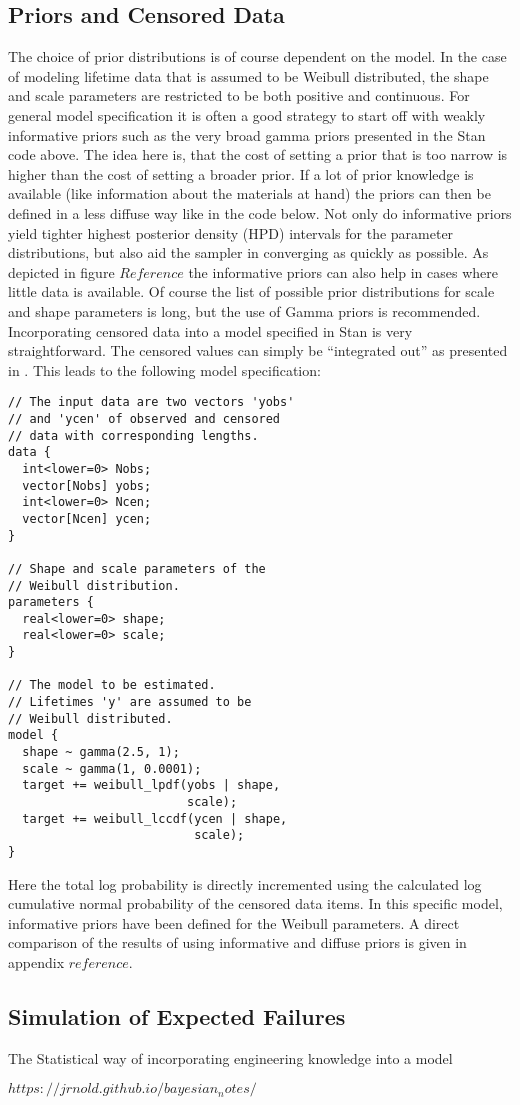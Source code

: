 \subsection{Priors and Censored Data}
The choice of prior distributions is of course dependent on the model. In the case of modeling lifetime data that is assumed to be Weibull distributed, the shape and scale parameters are restricted to be both positive and continuous. For general model specification it is often a good strategy to start off with weakly informative priors such as the very broad gamma priors presented in the Stan code above. The idea here is, that the cost of setting a prior that is too narrow is higher than the cost of setting a broader prior. If a lot of prior knowledge is available (like information about the materials at hand) the priors can then be defined in a less diffuse way like in the code below. Not only do informative priors yield tighter highest posterior density (HPD) intervals for the parameter distributions, but also aid the sampler in converging as quickly as possible. As depicted in figure $Reference$ the informative priors can also help in cases where little data is available. Of course the list of possible prior distributions for scale and shape parameters is long, but the use of Gamma priors is recommended. \cite{gammaprior} \\
Incorporating censored data into a model specified in Stan is very straightforward. The censored values can simply be ``integrated out'' as presented in \cite{censoreddatastan}. This leads to the following model specification: 
\begin{verbatim}
// The input data are two vectors 'yobs'
// and 'ycen' of observed and censored 
// data with corresponding lengths. 
data {
  int<lower=0> Nobs;
  vector[Nobs] yobs;
  int<lower=0> Ncen;
  vector[Ncen] ycen;
}

// Shape and scale parameters of the
// Weibull distribution.
parameters {
  real<lower=0> shape;
  real<lower=0> scale;
}

// The model to be estimated. 
// Lifetimes 'y' are assumed to be
// Weibull distributed. 
model {
  shape ~ gamma(2.5, 1);
  scale ~ gamma(1, 0.0001);
  target += weibull_lpdf(yobs | shape, 
                         scale);
  target += weibull_lccdf(ycen | shape, 
                          scale);
}
\end{verbatim}
Here the total log probability is directly incremented using the calculated log cumulative normal probability of the censored data items. In this specific model, informative priors have been defined for the Weibull parameters. A direct comparison of the results of using informative and diffuse priors is given in appendix $reference$.

\subsection{Simulation of Expected Failures}

The Statistical way of incorporating engineering knowledge into a model 

$https://jrnold.github.io/bayesian_notes/$
